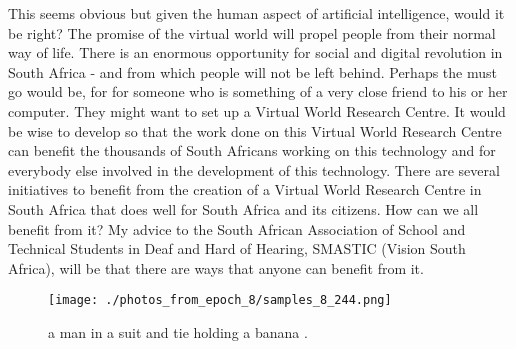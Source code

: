\documentclass{article}%
\begin{document}
This seems obvious but given the human aspect of artificial intelligence, would it be right? The promise of the virtual world will propel people from their normal way of life. There is an enormous opportunity for social and digital revolution in South Africa {-} and from which people will not be left behind.\newline%
Perhaps the must go would be, for for someone who is something of a very close friend to his or her computer. They might want to set up a Virtual World Research Centre. It would be wise to develop so that the work done on this Virtual World Research Centre can benefit the thousands of South Africans working on this technology and for everybody else involved in the development of this technology.\newline%
There are several initiatives to benefit from the creation of a Virtual World Research Centre in South Africa that does well for South Africa and its citizens. How can we all benefit from it? My advice to the South African Association of School and Technical Students in Deaf and Hard of Hearing, SMASTIC (Vision South Africa), will be that there are ways that anyone can benefit from it.\newline%

%


\begin{figure}[h!]%
\centering%
\texttt{[image: ./photos\_from\_epoch\_8/samples\_8\_244.png]}%
\caption{a man in a suit and tie holding a banana .}%
\end{figure}

%
\end{document}
